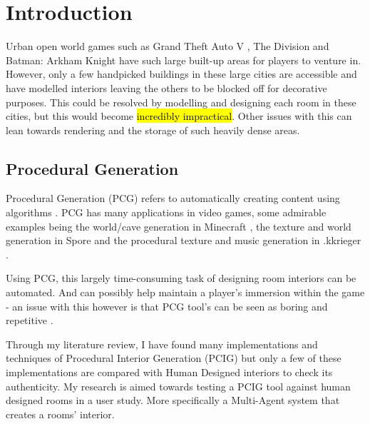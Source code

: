 \section{Introduction}
Urban open world games such as Grand Theft Auto V \cite{game:gta}, The Division \cite{game:division} and Batman: Arkham Knight \cite{game:arkham-knight} have such large built-up areas for players to venture in. However, only a few handpicked buildings in these large cities are accessible and have  modelled interiors leaving the others to be blocked off for decorative purposes. This could be resolved by modelling and designing each room in these cities, but this would become \hl{incredibly impractical}. Other issues with this can lean towards rendering and the storage of such heavily dense areas.

\subsection*{Procedural Generation}
Procedural Generation (PCG) refers to automatically creating content using algorithms \cite{what-is-pcg}. PCG has many applications in video games, some admirable examples being the world/cave generation in Minecraft \cite{game:minecraft}, the texture\cite{game:spore-texture} and world generation\cite{game:spore-world} in Spore \cite{game:spore} and the procedural texture and music generation in .kkrieger \cite{game:kkreiger}.

Using PCG, this largely time-consuming task of designing room interiors can be automated. And can possibly help maintain a player's immersion within the game - an issue with this however is that PCG tool's can be seen as boring and repetitive \cite[Chapter~2]{pcg_in_gd}.

Through my literature review, I have found many implementations and techniques of Procedural Interior Generation (PCIG) but only a few of these implementations are compared with Human Designed interiors to check its authenticity. My research is aimed towards testing a PCIG tool against human designed rooms in a user study. More specifically a Multi-Agent system that creates a rooms' interior.

